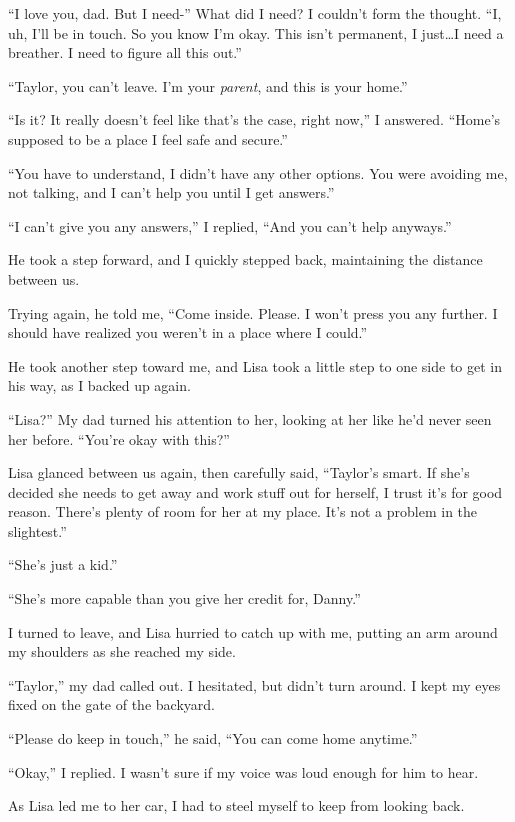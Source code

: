 ``I love you, dad.  But I need-''  What did I need?  I couldn't form the thought.  ``I, uh, I'll be in touch.  So you know I'm okay.  This isn't permanent, I just\ldots I need a breather.  I need to figure all this out.''



``Taylor, you can't leave. I'm your \emph{parent}, and this is your home.''



``Is it?  It really doesn't feel like that's the case, right now,'' I answered.  ``Home's supposed to be a place I feel safe and secure.''



``You have to understand, I didn't have any other options.  You were avoiding me, not talking, and I can't help you until I get answers.''



``I can't give you any answers,'' I replied, ``And you can't help anyways.''



He took a step forward, and I quickly stepped back, maintaining the distance between us.



Trying again, he told me, ``Come inside.  Please.  I won't press you any further.  I should have realized you weren't in a place where I could.''



He took another step toward me, and Lisa took a little step to one side to get in his way, as I backed up again.



``Lisa?'' My dad turned his attention to her, looking at her like he'd never seen her before.  ``You're okay with this?''



Lisa glanced between us again, then carefully said, ``Taylor's smart.  If she's decided she needs to get away and work stuff out for herself, I trust it's for good reason.  There's plenty of room for her at my place.  It's not a problem in the slightest.''



``She's just a kid.''



``She's more capable than you give her credit for, Danny.''



I turned to leave, and Lisa hurried to catch up with me, putting an arm around my shoulders as she reached my side.



``Taylor,'' my dad called out.  I hesitated, but didn't turn around.  I kept my eyes fixed on the gate of the backyard.



``Please do keep in touch,'' he said, ``You can come home anytime.''



``Okay,'' I replied.  I wasn't sure if my voice was loud enough for him to hear.



As Lisa led me to her car, I had to steel myself to keep from looking back.





